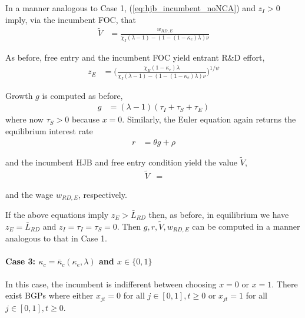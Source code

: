 \documentclass[11pt,english]{article}
\theoremstyle{remark}
\begin{document}
In a manner analogous to Case 1, (\ref{eq:hjb_incumbent_noNCA}) and $z_I > 0$ imply, via the incumbent FOC, that
\begin{align}
\tilde{V} &= \frac{w_{RD,E}}{\chi_I(\lambda - 1) - (1-(1-\kappa_{e})\lambda)\nu} \label{eq:hjb_incumbent_foc_noNCA}
\end{align}

As before, free entry and the incumbent FOC yield entrant R\&D effort, 
\begin{align}
	z_E &= \Big( \frac{\chi_E (1-\kappa_{e}) \lambda}{\chi_I(\lambda-1) - (1-(1-\kappa_e)\lambda)\nu } \Big)^{1/\psi} \label{eq:effort_entrant_case2}
\end{align}

Growth $g$ is computed as before,
\begin{align}
g &= (\lambda - 1)(\tau_I + \tau_S + \tau_E) \label{eq:growth_accounting_noNCA}
\end{align}
where now $\tau_S > 0$ because $x = 0$. Similarly, the Euler equation again returns the equilibrium interest rate 
\begin{align*}
	r &= \theta g + \rho
\end{align*}

and the incumbent HJB and free entry condition yield the value $\tilde{V}$,
\begin{align}
	\tilde{V} &= 
\end{align} 

and the wage $w_{RD,E}$, respectively. 

If the above equations imply $z_E > \bar{L}_{RD}$ then, as before, in equilibrium we have $z_E = \bar{L}_{RD}$ and $z_I = \tau_I = \tau_S = 0$. Then $g,r,\tilde{V},w_{RD,E}$ can be computed in a manner analogous to that in Case 1.  

\paragraph{Case 3: $\kappa_c = \bar{\kappa}_c(\kappa_e,\lambda)$ and $x \in \{0,1\}$}

In this case, the incumbent is indifferent between choosing $x = 0$ or $x = 1$. There exist BGPs where either $x_{jt} = 0$ for all $j\in[0,1],t \ge 0$ or $x_{jt} = 1$ for all $j\in[0,1],t \ge 0$.
\end{document}
